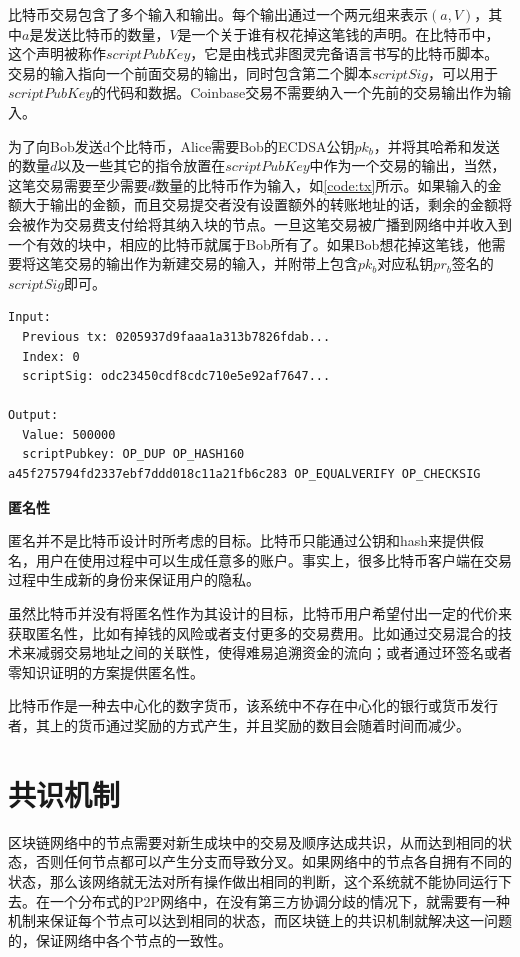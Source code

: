 比特币交易包含了多个输入和输出。每个输出通过一个两元组来表示$(a,V)$，其中$a$是发送比特币的数量，$V$是一个关于谁有权花掉这笔钱的声明。在比特币中，这个声明被称作$scriptPubKey$，它是由栈式非图灵完备语言书写的比特币脚本。交易的输入指向一个前面交易的输出，同时包含第二个脚本$scriptSig$，可以用于$scriptPubKey$的代码和数据。Coinbase交易不需要纳入一个先前的交易输出作为输入。

为了向Bob发送d个比特币，Alice需要Bob的ECDSA公钥$pk_b$，并将其哈希和发送的数量$d$以及一些其它的指令放置在$scriptPubKey$中作为一个交易的输出，当然，这笔交易需要至少需要$d$数量的比特币作为输入，如\ref{code:tx}所示。如果输入的金额大于输出的金额，而且交易提交者没有设置额外的转账地址的话，剩余的金额将会被作为交易费支付给将其纳入块的节点。一旦这笔交易被广播到网络中并收入到一个有效的块中，相应的比特币就属于Bob所有了。如果Bob想花掉这笔钱，他需要将这笔交易的输出作为新建交易的输入，并附带上包含$pk_b$对应私钥$pr_b$签名的$scriptSig$即可。

\begin{lstlisting}[caption={比特币交易实例}, label=code:tx]
Input:
  Previous tx: 0205937d9faaa1a313b7826fdab...
  Index: 0
  scriptSig: odc23450cdf8cdc710e5e92af7647...

Output:
  Value: 500000
  scriptPubkey: OP_DUP OP_HASH160 a45f275794fd2337ebf7ddd018c11a21fb6c283 OP_EQUALVERIFY OP_CHECKSIG

\end{lstlisting}


\noindent\textbf{匿名性}

匿名并不是比特币设计时所考虑的目标。比特币只能通过公钥和hash来提供假名，用户在使用过程中可以生成任意多的账户。事实上，很多比特币客户端在交易过程中生成新的身份来保证用户的隐私。

虽然比特币并没有将匿名性作为其设计的目标，比特币用户希望付出一定的代价来获取匿名性，比如有掉钱的风险或者支付更多的交易费用。比如通过交易混合\cite{bonneau2014mixcoin}的技术来减弱交易地址之间的关联性，使得难易追溯资金的流向；或者通过环签名或者零知识证明\cite{kosba2016hawk}的方案提供匿名性。


比特币作是一种去中心化的数字货币，该系统中不存在中心化的银行或货币发行者，其上的货币通过奖励的方式产生，并且奖励的数目会随着时间而减少。

\section{共识机制}

区块链网络中的节点需要对新生成块中的交易及顺序达成共识，从而达到相同的状态，否则任何节点都可以产生分支而导致分叉。如果网络中的节点各自拥有不同的状态，那么该网络就无法对所有操作做出相同的判断，这个系统就不能协同运行下去。在一个分布式的P2P网络中，在没有第三方协调分歧的情况下，就需要有一种机制来保证每个节点可以达到相同的状态，而区块链上的共识机制就解决这一问题的，保证网络中各个节点的一致性。

